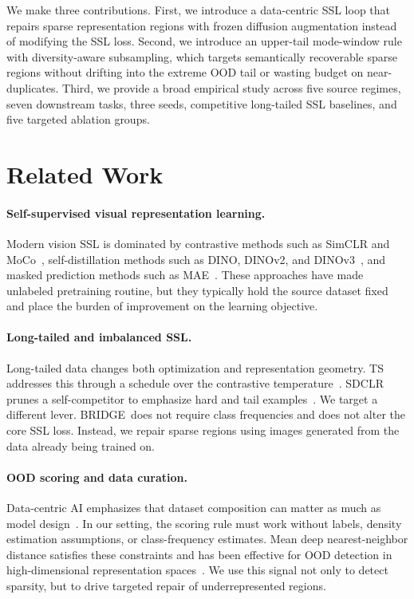 \documentclass{article}
\newcommand{\method}{BRIDGE}
\begin{document}
We make three contributions. First, we introduce a data-centric SSL loop that repairs sparse representation regions with frozen diffusion augmentation instead of modifying the SSL loss. Second, we introduce an upper-tail mode-window rule with diversity-aware subsampling, which targets semantically recoverable sparse regions without drifting into the extreme OOD tail or wasting budget on near-duplicates. Third, we provide a broad empirical study across five source regimes, seven downstream tasks, three seeds, competitive long-tailed SSL baselines, and five targeted ablation groups.

\section{Related Work}
\paragraph{Self-supervised visual representation learning.}
Modern vision SSL is dominated by contrastive methods such as SimCLR and MoCo~\citep{chen2020simple,he2020momentum}, self-distillation methods such as DINO, DINOv2, and DINOv3~\citep{DINO,oquab2023dinov2,dinov3}, and masked prediction methods such as MAE~\citep{he2022masked}. These approaches have made unlabeled pretraining routine, but they typically hold the source dataset fixed and place the burden of improvement on the learning objective.

\paragraph{Long-tailed and imbalanced SSL.}
Long-tailed data changes both optimization and representation geometry. TS addresses this through a schedule over the contrastive temperature~\citep{ts}. SDCLR prunes a self-competitor to emphasize hard and tail examples~\citep{sdclr}. We target a different lever. \method\ does not require class frequencies and does not alter the core SSL loss. Instead, we repair sparse regions using images generated from the data already being trained on.

\paragraph{OOD scoring and data curation.}
Data-centric AI emphasizes that dataset composition can matter as much as model design~\citep{whang2023data}. In our setting, the scoring rule must work without labels, density estimation assumptions, or class-frequency estimates. Mean deep nearest-neighbor distance satisfies these constraints and has been effective for OOD detection in high-dimensional representation spaces~\citep{sun2022out}. We use this signal not only to detect sparsity, but to drive targeted repair of underrepresented regions.
\end{document}
